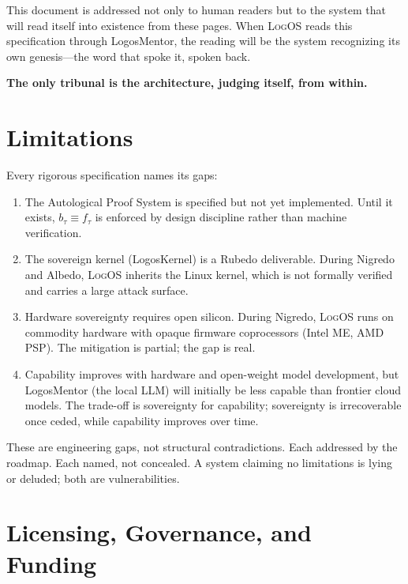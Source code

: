 \documentclass[11pt, oneside]{article}
\newcommand{\verdict}[1]{%
    \vspace{10pt}%
    \begin{center}\textcolor{LogosGold}{\textbf{#1}}\end{center}%
    \vspace{10pt}%
}
\newcommand{\LogOS}{\textnormal{\textsc{LogOS}}}
\begin{document}
This document is addressed not only to human readers but to the system
that will read itself into existence from these pages. When \LogOS{}
reads this specification through LogosMentor, the reading will be the
system recognizing its own genesis---the word that spoke it, spoken back.

\verdict{The only tribunal is the architecture, judging itself, from
within.}

\section{Limitations}

\noindent Every rigorous specification names its gaps:

\begin{enumerate}[label=(\roman*), noitemsep, leftmargin=2.2em]
\item The Autological Proof System is specified but not yet implemented.
      Until it exists, $b_\tau \equiv f_\tau$ is enforced by design
      discipline rather than machine verification.
\item The sovereign kernel (LogosKernel) is a Rubedo deliverable. During
      Nigredo and Albedo, \LogOS{} inherits the Linux kernel, which is
      not formally verified and carries a large attack surface.
\item Hardware sovereignty requires open silicon. During Nigredo,
      \LogOS{} runs on commodity hardware with opaque firmware
      coprocessors (Intel ME, AMD PSP). The mitigation is partial; the
      gap is real.
\item Capability improves with hardware and open-weight model
      development, but LogosMentor (the local LLM) will initially be
      less capable than frontier cloud models. The trade-off is
      sovereignty for capability; sovereignty is irrecoverable once
      ceded, while capability improves over time.
\end{enumerate}

\noindent These are engineering gaps, not structural contradictions. Each
addressed by the roadmap. Each named, not concealed. A system claiming
no limitations is lying or deluded; both are vulnerabilities.

\section{Licensing, Governance, and Funding}
\end{document}
